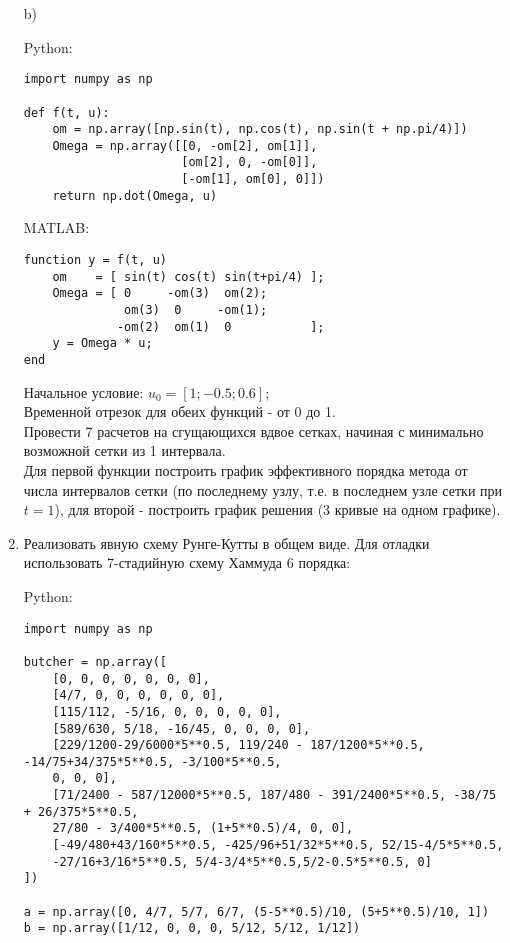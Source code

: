 \documentclass{article}
\begin{document}
\begin{enumerate}
b)

Python:
\begin{verbatim}
import numpy as np

def f(t, u):
    om = np.array([np.sin(t), np.cos(t), np.sin(t + np.pi/4)])
    Omega = np.array([[0, -om[2], om[1]],
                      [om[2], 0, -om[0]],
                      [-om[1], om[0], 0]])
    return np.dot(Omega, u)
\end{verbatim}

MATLAB:
\begin{matlablisting}
	\begin{verbatim}
function y = f(t, u)
    om    = [ sin(t) cos(t) sin(t+pi/4) ];
    Omega = [ 0     -om(3)  om(2); 
              om(3)  0     -om(1);
             -om(2)  om(1)  0           ];
    y = Omega * u;
end
	\end{verbatim}
\end{matlablisting}

Начальное условие: $u_0 = [1; -0.5; 0.6];$\\
Временной отрезок для обеих функций - от 0 до 1.\\
Провести 7 расчетов на сгущающихся вдвое сетках, начиная с минимально возможной сетки из 1 интервала.\\
Для первой функции построить график эффективного порядка метода от числа интервалов сетки (по последнему узлу, т.е. в последнем узле сетки при $t=1$), для второй - построить график решения (3 кривые на одном графике). 
\item Реализовать явную схему Рунге-Кутты в общем виде. Для отладки использовать 7-стадийную схему Хаммуда 6 порядка:  

Python:
\begin{verbatim}
import numpy as np

butcher = np.array([
    [0, 0, 0, 0, 0, 0, 0],
    [4/7, 0, 0, 0, 0, 0, 0],
    [115/112, -5/16, 0, 0, 0, 0, 0],
    [589/630, 5/18, -16/45, 0, 0, 0, 0],
    [229/1200-29/6000*5**0.5, 119/240 - 187/1200*5**0.5, -14/75+34/375*5**0.5, -3/100*5**0.5,
    0, 0, 0],
    [71/2400 - 587/12000*5**0.5, 187/480 - 391/2400*5**0.5, -38/75 + 26/375*5**0.5,
    27/80 - 3/400*5**0.5, (1+5**0.5)/4, 0, 0],
    [-49/480+43/160*5**0.5, -425/96+51/32*5**0.5, 52/15-4/5*5**0.5,
    -27/16+3/16*5**0.5, 5/4-3/4*5**0.5,5/2-0.5*5**0.5, 0]
])

a = np.array([0, 4/7, 5/7, 6/7, (5-5**0.5)/10, (5+5**0.5)/10, 1])
b = np.array([1/12, 0, 0, 0, 5/12, 5/12, 1/12])


\end{verbatim}
\end{enumerate}
\end{document}
